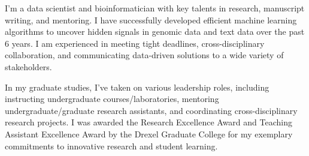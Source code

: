 

\begin{cvparagraph}

I’m a data scientist and bioinformatician with key talents in research, manuscript writing, and mentoring. I have successfully developed efficient machine learning algorithms to uncover hidden signals in genomic data and text data over the past 6 years. I am experienced in meeting tight deadlines, cross-disciplinary collaboration, and communicating data-driven solutions to a wide variety of stakeholders. 

In my graduate studies, I’ve taken on various leadership roles, including instructing undergraduate courses/laboratories, mentoring undergraduate/graduate research assistants, and coordinating cross-disciplinary research projects. I was awarded the Research Excellence Award and Teaching Assistant Excellence Award by the Drexel Graduate College for my exemplary commitments to innovative research and student learning. 
\end{cvparagraph}